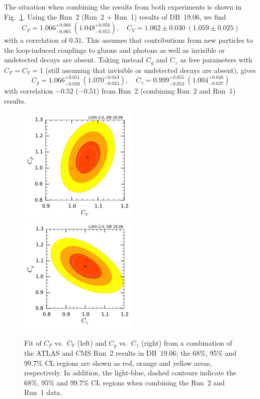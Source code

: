The situation when combining the results from both experiments is shown in Fig.~\ref{fig:rcfit-comb}. 
Using the Run~2 (Run~2 + Run~1) results of DB~19.06, we find   
\begin{equation}
C_F = 1.066^{+0.066}_{-0.065} ~ (1.048^{+0.056}_{-0.055}), \quad  C_V = 1.062\pm 0.030 ~ (1.059\pm 0.025) 
\end{equation}
with a correlation of $0.31$. This assumes that contributions from new particles 
to the loop-induced couplings to gluons and photons as well as invisible or undetected decays are absent. 
Taking instead $C_g$ and $C_\gamma$ as free parameters with $C_F=C_V=1$ (still assuming that 
invisible or undetected decays are absent), gives    
\begin{equation}
   C_g = 1.066^{+0.051}_{-0.050} ~ (1.070^{+0.043}_{-0.043}) , \quad  
   C_\gamma = 0.999^{+0.055}_{-0.053}~ (1.004^{+0.048}_{-0.047})
\end{equation}
with correlation $-0.52$ ($-0.51$) from Run~2 (combining Run~2 and Run~1) results.

\begin{figure}[h!]\centering
\includegraphics[width=0.5\textwidth]{fits/CVCF_2d_comb.pdf}%
\includegraphics[width=0.5\textwidth]{fits/CgCGa_2d_comb.pdf}%
\vspace*{-2mm}
\caption{Fit of $C_F$ vs.\ $C_V$ (left) and $C_g$ vs.\ $C_\gamma$ (right) from a combination of the ATLAS and CMS 
Run~2 results in DB~19.06; the 68\%, 95\% and 99.7\% CL regions are shown as red, orange and yellow areas, respectively. 
In addition, the light-blue, dashed contours indicate the 68\%, 95\% and 99.7\% CL regions when combining the Run~2 and Run~1 data.}
\label{fig:rcfit-comb}
\end{figure}


